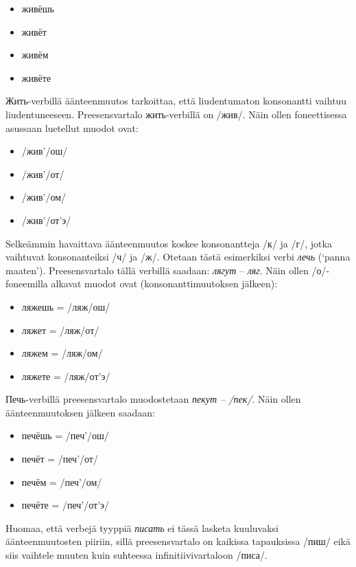 \documentclass[]{scrartcl}
\providecommand{\tightlist}{%
  \setlength{\itemsep}{0pt}\setlength{\parskip}{0pt}}
\begin{document}
\begin{itemize}
\tightlist
\item
  живёшь
\item
  живёт
\item
  живём
\item
  живёте
\end{itemize}

Жить-verbillä äänteenmuutos tarkoittaa, että liudentumaton konsonantti
vaihtuu liudentuneeseen. Preesensvartalo жить-verbillä on /жив/. Näin
ollen foneettisessa asussaan luetellut muodot ovat:

\begin{itemize}
\tightlist
\item
  /жив'/ош/
\item
  /жив'/от/
\item
  /жив'/ом/
\item
  /жив'/от'э/
\end{itemize}

Selkeämmin havaittava äänteenmuutos koskee konsonantteja /к/ ja /г/,
jotka vaihtuvat konsonanteiksi /ч/ ja /ж/. Otetaan tästä esimerkiksi
verbi \emph{лечь} (`panna maaten'). Preesensvartalo tällä verbillä
saadaan: \emph{лягут} -- \emph{ляг}. Näin ollen /о/-foneemilla alkavat
muodot ovat (konsonanttimuutoksen jälkeen):

\begin{itemize}
\tightlist
\item
  ляжешь = /ляж/ош/
\item
  ляжет = /ляж/от/
\item
  ляжем = /ляж/ом/
\item
  ляжете = /ляж/от'э/
\end{itemize}

Печь-verbillä preesensvartalo muodostetaan \emph{пекут -- /пек/}. Näin
ollen äänteenmuutoksen jälkeen saadaan:

\begin{itemize}
\tightlist
\item
  печёшь = /печ'/ош/
\item
  печёт = /печ'/от/
\item
  печём = /печ'/ом/
\item
  печёте = /печ'/от'э/
\end{itemize}

Huomaa, että verbejä tyyppiä \emph{писать} ei tässä lasketa kuuluvaksi
äänteenmuutosten piiriin, sillä preesensvartalo on kaikissa tapauksissa
/пиш/ eikä siis vaihtele muuten kuin suhteessa infinitiivivartaloon
/писа/.
\end{document}
